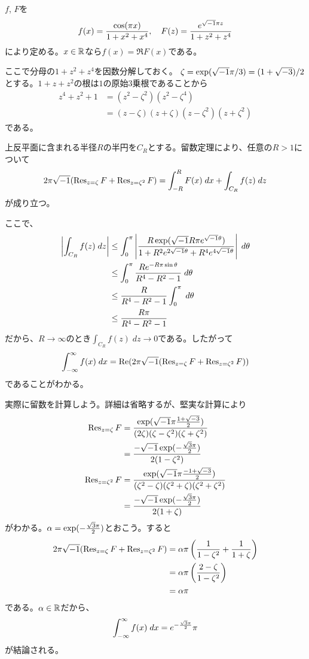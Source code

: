 \subsubsection{} %
\begin{sol}
$f$, $F$を
    \[
    f(x) = \frac{\cos(\pi x)}{1 + x^2 + x^4}, \quad F(z) = \frac{e^{\sqrt{-1} \pi z}}{1 + z^2 + z^4}
    \]
により定める。$x \in {\mathbb R}$なら$f(x) = \Re F(x)$である。

ここで分母の$1 + z^2 + z^4$を因数分解しておく。
$\zeta = \exp(\sqrt{-1} \pi / 3) = (1 + \sqrt{-3})/ 2$とする。$1+z + z^2$の根は$1$の原始$3$乗根であることから
\begin{align*}
  z^4 + z^2 + 1 &= (z^2 - \zeta^2)(z^2 - \zeta^4) \\
  &= (z - \zeta )(z + \zeta) (z - \zeta^2)(z + \zeta^2)
\end{align*}
である。

上反平面に含まれる半径$R$の半円を$C_R$とする。留数定理により、任意の$R > 1$について
\[
2 \pi \sqrt{-1} ( \operatorname{Res}_{z=\zeta} F + \operatorname{Res}_{z=\zeta^2} F ) = \int_{-R}^R F(x) \; dx + \int_{C_R} f(z) \; dz
\]
が成り立つ。

ここで、
\begin{align*}
  \left \lvert \int_{C_R} f(z) \; dz  \right \rvert &\leq \int_0^{\pi} \left \lvert  \frac{R \exp(\sqrt{-1} R \pi e^{\sqrt{-1} {\theta}}) }{ 1 + R^2e^{2 \sqrt{-1} {\theta}} +  R^4e^{4 \sqrt{-1} {\theta}}}  \right \rvert \; d{\theta} \\
  &\leq  \int_0^{\pi} \frac{R e^{- R \pi \sin {\theta}} }{R^4 - R^2 - 1}   \; d{\theta} \\
  &\leq \frac{R  }{R^4 - R^2 - 1}  \int_0^{\pi} \; d{\theta} \\
  &\leq  \frac{R \pi }{R^4 - R^2 - 1}
\end{align*}
だから、$R \to \infty$のとき$\int_{C_R} f(z) \; dz \to 0$である。したがって
\[
 \int_{-\infty}^{\infty} f(x) \; dx =  \operatorname{Re}( 2 \pi \sqrt{-1} ( \operatorname{Res}_{z=\zeta} F + \operatorname{Res}_{z=\zeta^2} F ) )
\]
であることがわかる。

実際に留数を計算しよう。詳細は省略するが、堅実な計算により
\begin{align*}
  \operatorname{Res}_{z=\zeta} F &= \frac{ \exp(\sqrt{-1} \pi \frac{1 + \sqrt{-3}}{2} ) }{(2\zeta) (\zeta - \zeta^2) (\zeta + \zeta^2)  } \\
  &= \frac{ - \sqrt{-1} \exp(- \frac{\sqrt{3}\pi}{2} ) }{2(1 - \zeta^2)} \\
  \operatorname{Res}_{z=\zeta^2} F &= \frac{ \exp(\sqrt{-1} \pi \frac{-1 + \sqrt{-3}}{2} ) }{(\zeta^2 - \zeta) (\zeta^2 + \zeta) (\zeta^2 + \zeta^2)  } \\
  &=  \frac{ - \sqrt{-1} \exp(- \frac{\sqrt{3}\pi}{2} ) }{2(1 + \zeta)}
\end{align*}
がわかる。${\alpha} = \exp(- \frac{\sqrt{3}\pi}{2} )$とおこう。すると
\begin{align*}
  2 \pi \sqrt{-1} ( \operatorname{Res}_{z=\zeta} F + \operatorname{Res}_{z=\zeta^2} F ) &= {\alpha} \pi \left( \frac{1}{1 - \zeta^2} + \frac{1}{1+ \zeta} \right) \\
  &= {\alpha} \pi \left( \frac{2 - \zeta}{ 1 - \zeta^2} \right) \\
  &= {\alpha} \pi
\end{align*}
である。${\alpha} \in {\mathbb R}$だから、
\[
 \int_{-\infty}^{\infty} f(x) \; dx = e^{- \frac{\sqrt{3}\pi}{2} } \pi
\]
が結論される。
\end{sol}
\newpage


